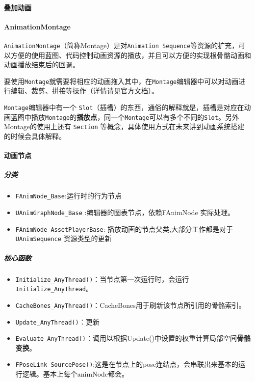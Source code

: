 \documentclass[UTF8,a4paper,12pt]{ctexbook}
\begin{document}
			
			\paragraph{叠加动画}
			
			
			\paragraph{AnimationMontage}
				\verb|AnimationMontage|（简称Montage）是对\verb|Animation Sequence|等资源的扩充，可以方便的使用蓝图、代码控制动画资源的播放，并且可以方便的实现根骨骼动画和动画播放结束后的回调。
				
				要使用\verb|Montage|就需要将相应的动画拖入其中，在\verb|Montage|编辑器中可以对动画进行编辑、裁剪、拼接等操作（详情请见官方文档）。
				
				\verb|Montage|编辑器中有一个 \verb|Slot|（插槽）的东西，通俗的解释就是，插槽是对应在动画蓝图中播放\verb|Montage|的\textbf{播放点}，同一个\verb|Montage|可以有多个不同的\verb|Slot|。另外Montage的使用上还有 \verb|Section| 等概念，具体使用方式在未来讲到动画系统搭建的时候会具体解释。
			
			
			
			\paragraph{动画节点}
				
				\subparagraph{分类}
					
					\begin{itemize}
						\item \verb|FAnimNode_Base|:{运行时的行为节点}
						\item \verb|UAnimGraphNode_Base| :{编辑器的图表节点}，依赖FAnimNode 实际处理。
						\item \verb|FAnimNode_AssetPlayerBase|: 播放动画的节点父类,大部分工作都是对于\verb|UAnimSequence| 资源类型的更新
					\end{itemize}
					
					
				\subparagraph{核心函数}
				
					\begin{itemize}
						\item \verb|Initialize_AnyThread()|：当节点第一次运行时，会运行\verb|Initialize_AnyThread|。
						\item \verb|CacheBones_AnyThread()|：CacheBones用于刷新该节点所引用的骨骼索引。
						\item \verb|Update_AnyThread()|：更新
						\item \verb|Evaluate_AnyThread()|：调用以根据Update()中设置的权重计算局部空间\textbf{骨骼变换}。
						\item \verb|FPoseLink SourcePose()|;这是在节点上的pose连结点，会串联出来基本的运行逻辑。基本上每个animNode都会。
					\end{itemize}		
					
\end{document}
